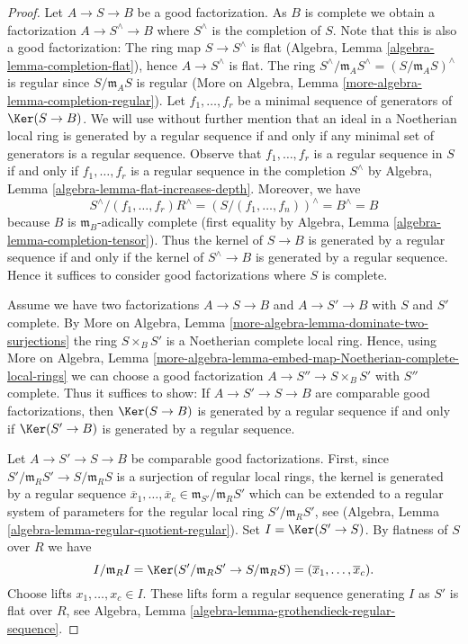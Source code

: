 \begin{proof}
Let $A \to S \to B$ be a good factorization.
As $B$ is complete we obtain a factorization
$A \to S^\wedge \to B$ where $S^\wedge$ is the completion of $S$.
Note that this is also a good factorization:
The ring map $S \to S^\wedge$ is flat
(Algebra, Lemma \ref{algebra-lemma-completion-flat}),
hence $A \to S^\wedge$ is flat.
The ring $S^\wedge/\mathfrak m_A S^\wedge = (S/\mathfrak m_A S)^\wedge$
is regular since $S/\mathfrak m_A S$ is regular
(More on Algebra, Lemma \ref{more-algebra-lemma-completion-regular}).
Let $f_1, \ldots, f_r$ be a minimal sequence of generators
of $\Ker(S \to B)$. We will use without further mention
that an ideal in a Noetherian local ring is generated by a regular
sequence if and only if any minimal set of generators is a
regular sequence. Observe that $f_1, \ldots, f_r$
is a regular sequence in $S$ if and only if $f_1, \ldots, f_r$
is a regular sequence in the completion $S^\wedge$ by
Algebra, Lemma \ref{algebra-lemma-flat-increases-depth}.
Moreover, we have
$$
S^\wedge/(f_1, \ldots, f_r)R^\wedge =
(S/(f_1, \ldots, f_n))^\wedge = B^\wedge = B
$$
because $B$ is $\mathfrak m_B$-adically complete (first equality by
Algebra, Lemma \ref{algebra-lemma-completion-tensor}).
Thus the kernel of $S \to B$ is generated by a regular sequence
if and only if the kernel of $S^\wedge \to B$ is generated by a
regular sequence.
Hence it suffices to consider good factorizations where $S$ is complete.

\medskip\noindent
Assume we have two factorizations $A \to S \to B$ and
$A \to S' \to B$ with $S$ and $S'$ complete. By
More on Algebra, Lemma \ref{more-algebra-lemma-dominate-two-surjections}
the ring $S \times_B S'$ is a Noetherian complete local ring.
Hence, using More on Algebra, Lemma
\ref{more-algebra-lemma-embed-map-Noetherian-complete-local-rings}
we can choose a good factorization $A \to S'' \to S \times_B S'$
with $S''$ complete. Thus it suffices to show:
If $A \to S' \to S \to B$ are comparable good factorizations,
then $\Ker(S \to B)$ is generated by a regular sequence
if and only if $\Ker(S' \to B)$ is generated by a regular sequence.

\medskip\noindent
Let $A \to S' \to S \to B$ be comparable good factorizations.
First, since $S'/\mathfrak m_R S' \to S/\mathfrak m_R S$ is
a surjection of regular local rings, the kernel is generated
by a regular sequence
$\overline{x}_1, \ldots, \overline{x}_c \in
\mathfrak m_{S'}/\mathfrak m_R S'$
which can be extended to a regular system of parameters for
the regular local ring $S'/\mathfrak m_R S'$, see
(Algebra, Lemma \ref{algebra-lemma-regular-quotient-regular}).
Set $I = \Ker(S' \to S)$. By flatness of $S$ over $R$ we have
$$
I/\mathfrak m_R I =
\Ker(S'/\mathfrak m_R S' \to S/\mathfrak m_R S) =
(\overline{x}_1, \ldots, \overline{x}_c).
$$
Choose lifts $x_1, \ldots, x_c \in I$. These lifts form a regular sequence
generating $I$ as $S'$ is flat over $R$, see
Algebra, Lemma \ref{algebra-lemma-grothendieck-regular-sequence}.


\end{proof}
